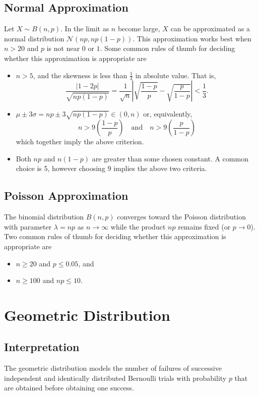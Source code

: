 \documentclass[1pt]{report}
\newcommand{\<}{\langle}
\renewcommand{\>}{\rangle}
\begin{document}
\subsection{Normal Approximation} 
Let $X \sim B(n, p)$. In the limit as $n$ become large, $X$ can be approximated as a normal distribution $\mathcal{N}(np, np(1-p))$. This approximation works best when $n > 20$ and $p$ is not near $0$ or $1$. Some common rules of thumb for deciding whether this approximation is appropriate are
\begin{itemize}
\item $n > 5$, and the skewness is less than $\frac{1}{3}$ in absolute value. That is,
$$\frac{|1 - 2p|}{\sqrt{np(1-p)}} = \frac{1}{\sqrt{n}} \left|\sqrt{\frac{1-p}{p}} - \sqrt{\frac{p}{1-p}} \right| < \frac{1}{3}.$$
\item $\mu \pm 3\sigma = np\pm 3\sqrt{np(1-p)} \in (0,n)$ or, equivalently,
$$n > 9 \left(\frac{1-p}{p}\right)\quad \text{and} \quad n > 9 \left(\frac{p}{1-p}\right)$$
which together imply the above criterion.
\item Both $np$ and $n(1-p)$ are greater than some chosen constant. A common choice is 5, however choosing 9 implies the above two criteria.
\end{itemize}
\subsection{Poisson Approximation}  The binomial distribution $B(n,p)$ converges toward the Poisson distribution with parameter $\lambda = np$ as $n \to \infty$ while the product $np$ remains fixed (or $p\to 0$). Two common rules of thumb for deciding whether this approximation is appropriate are
\begin{itemize}
\item $n \geq 20$ and $p \leq 0.05$, and
\item $n \geq 100$ and $np \leq 10$.
\end{itemize}
\newpage
\section{Geometric Distribution}
\subsection{Interpretation}
The geometric distribution models the number of failures of successive independent and identically distributed Bernoulli trials with probability $p$ that are obtained before obtaining one success.
\end{document}
